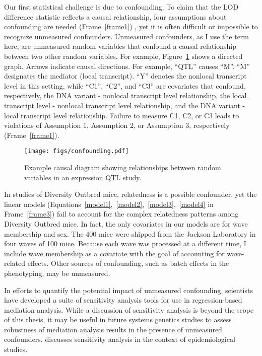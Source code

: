 \documentclass[oneside]{book}\usepackage[]{graphicx}\usepackage[]{color}
\begin{document}
\begin{titlepage}
Our first statistical challenge is due to confounding. To claim that the LOD
difference statistic reflects a causal relationship, four assumptions about
confounding are needed (Frame~\ref{frame1}) \citep{vanderweele2015explanation},
yet
it is often difficult or impossible to recognize unmeasured confounders. Unmeasured
confounders, as I use the term here, are unmeasured random variables that confound a causal
relationship between two other random variables.
For example, Figure~\ref{fig:confounding} shows a directed graph. Arrows indicate causal
directions. For example, ``QTL'' causes ``M''. ``M'' designates the mediator (local transcript). ``Y'' denotes the nonlocal transcript
level in this setting, while ``C1'', ``C2'', and ``C3'' are covariates that confound,
respectively, the DNA variant - nonlocal transcript level relationship, the local transcript
level - nonlocal transcript level relationship, and the DNA variant - local transcript level
relationship. Failure to measure C1, C2, or C3 leads to violations of Assumption 1,
Assumption 2, or Assumption 3, respectively (Frame~\ref{frame1}).

\begin{figure}
\texttt{[image: figs/confounding.pdf]}
\caption{Example causal diagram showing relationships between random variables in an expression QTL study.}\label{fig:confounding}
\end{figure}



In studies of Diversity Outbred mice, relatedness is a possible confounder,
yet the linear models (Equations~\ref{model1},~\ref{model2},~\ref{model3},~\ref{model4}
in Frame~\ref{frame3}) fail to account for the complex relatedness patterns
among Diversity Outbred mice.
In fact, the only covariates in our models are for wave membership and sex.
The 400 mice were shipped from the Jackson Laboratory in four waves of 100 mice.
Because each wave was processed at a different time, I include wave membership
as a covariate with the goal of accounting for wave-related effects.
Other sources of confounding, such as batch effects in the phenotyping, may be
unmeasured.

In efforts to quantify the potential impact of unmeasured confounding, scientists have
developed a suite of sensitivity analysis tools for use in regression-based mediation analysis.
While a discussion of sensitivity analysis is beyond the scope of this thesis,
it may be useful in future systems genetics studies to assess robustness of mediation analysis
results in the presence of unmeasured confounders.
\citet{vanderweele2015explanation} discusses sensitivity analysis in the context of epidemiological studies.








\end{titlepage}
\end{document}
